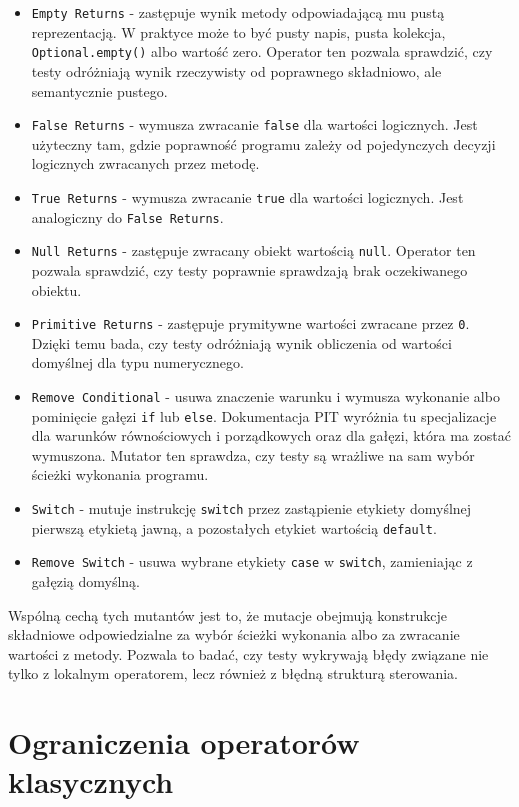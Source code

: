 \documentclass[12pt,a4paper,oldfontcommands]{memoir}
\theoremstyle{plain}
\theoremstyle{definition}
\theoremstyle{remark}
\begin{document}
    \begin{itemize}
        \item \texttt{Empty Returns} - zastępuje wynik metody odpowiadającą mu pustą reprezentacją. W praktyce może to być pusty napis, pusta kolekcja, \texttt{Optional.empty()} albo wartość zero. Operator ten pozwala sprawdzić, czy testy odróżniają wynik rzeczywisty od poprawnego składniowo, ale semantycznie pustego.
        \item \texttt{False Returns} - wymusza zwracanie \texttt{false} dla wartości logicznych. Jest użyteczny tam, gdzie poprawność programu zależy od pojedynczych decyzji logicznych zwracanych przez metodę.
        \item \texttt{True Returns} - wymusza zwracanie \texttt{true} dla wartości logicznych. Jest analogiczny do \texttt{False Returns}.
        \item \texttt{Null Returns} - zastępuje zwracany obiekt wartością \texttt{null}. Operator ten pozwala sprawdzić, czy testy poprawnie sprawdzają brak oczekiwanego obiektu.
        \item \texttt{Primitive Returns} - zastępuje prymitywne wartości zwracane przez \texttt{0}. Dzięki temu bada, czy testy odróżniają wynik obliczenia od wartości domyślnej dla typu numerycznego.
        \item \texttt{Remove Conditional} - usuwa znaczenie warunku i wymusza wykonanie albo pominięcie gałęzi \texttt{if} lub \texttt{else}. Dokumentacja PIT wyróżnia tu specjalizacje dla warunków równościowych i porządkowych oraz dla gałęzi, która ma zostać wymuszona. Mutator ten sprawdza, czy testy są wrażliwe na sam wybór ścieżki wykonania programu.
        \item \texttt{Switch} - mutuje instrukcję \texttt{switch} przez zastąpienie etykiety domyślnej pierwszą etykietą jawną, a pozostałych etykiet wartością \texttt{default}.
        \item \texttt{Remove Switch} - usuwa wybrane etykiety \texttt{case} w \texttt{switch}, zamieniając z gałęzią domyślną.
    \end{itemize}

    Wspólną cechą tych mutantów jest to, że mutacje obejmują konstrukcje składniowe odpowiedzialne za wybór ścieżki wykonania albo za zwracanie wartości z metody.
    Pozwala to badać, czy testy wykrywają błędy związane nie tylko z lokalnym operatorem, lecz również z błędną strukturą sterowania.

    \section{Ograniczenia operatorów klasycznych}
\end{document}
